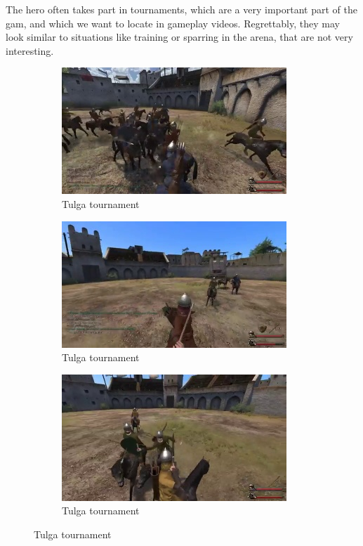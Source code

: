 \documentclass[
]{article}
\begin{document}
The hero often takes part in tournaments, which are a very important
part of the gam, and which we want to locate in gameplay videos. Regrettably, they may look similar to situations like training or sparring in the arena, that are not very interesting.



\begin{figure}[H]
	\centering
	\begin{subfigure}[b]{0.3\textwidth}
		\includegraphics[width=\linewidth]{docimages/E_0057_00_21_48.jpg}
		\caption{Tulga tournament}
	\end{subfigure}
	\begin{subfigure}[b]{0.3\textwidth}
		\includegraphics[width=\linewidth]{docimages/E_0061_00_25_56.jpg}
		\caption{Tulga tournament}
	\end{subfigure}
	\begin{subfigure}[b]{0.3\textwidth}
		\includegraphics[width=\linewidth]{docimages/E_0042_00_12_48.jpg}
		\caption{Tulga tournament}
	\end{subfigure}
\end{figure}
\end{document}
